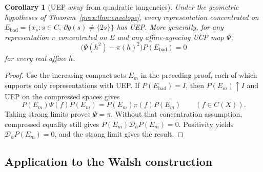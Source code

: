\documentclass[11pt,letterpaper]{amsart}
\newtheorem{corollary}[theorem]{Corollary}
\theoremstyle{definition}
\theoremstyle{remark}
\numberwithin{equation}{section}
\begin{document}
\begin{corollary}[UEP away from quadratic tangencies]
\label{prox:cor:source}
Under the geometric hypotheses of Theorem~\ref{prox:thm:envelope},
every representation concentrated on
$E_{\mathrm{bad}}=\{x_s:s\in C,\ \partial g(s)\ne\{2s\}\}$
has UEP. More generally, for any representation $\pi$ concentrated
on $E$ and any affine-agreeing UCP map $\Psi$,
\[
 \bigl(\Psi(h^2)-\pi(h)^2\bigr)P(E_{\mathrm{bad}})=0
\]
for every real affine $h$.
\end{corollary}
\begin{proof}
Use the increasing compact sets $E_m$ in the preceding proof,
each of which supports only representations with UEP.
If $P(E_{\mathrm{bad}})=I$, then $P(E_m)\uparrow I$ and UEP on
the compressed spaces gives
\[
 P(E_m)\Psi(f)P(E_m)=P(E_m)\pi(f)P(E_m)\qquad(f\in C(X)).
\]
Taking strong limits proves $\Psi=\pi$.
Without that concentration assumption, compressed equality still
gives $P(E_m)\mathcal D_hP(E_m)=0$. Positivity yields
$\mathcal D_hP(E_m)=0$, and the strong limit gives the result.
\end{proof}

\subsection{Application to the Walsh construction}
\end{document}
